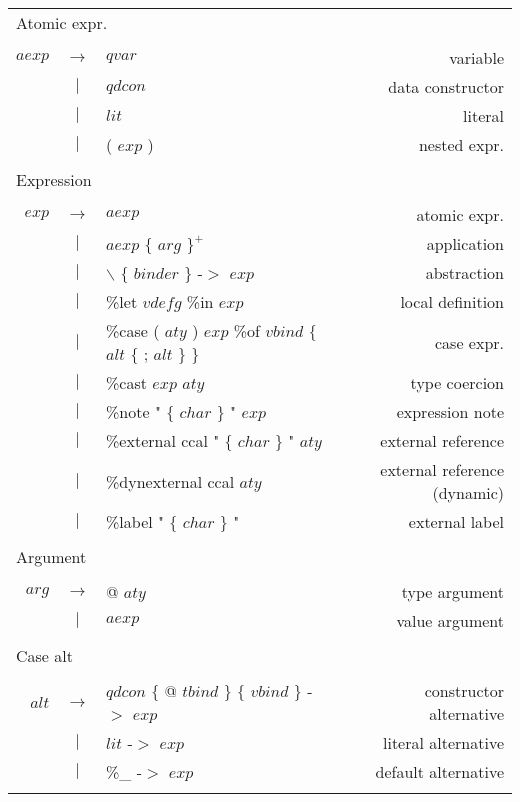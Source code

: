 \begin{scriptsize}
\begin{longtable}{ r c l r }
\multicolumn{4}{l}{Atomic expr.}			 \\
\\[0.01in]
$aexp$		& $ \rightarrow $	& $qvar$										& variable		\\
		& $ | $			& $qdcon$										& data constructor	\\
		& $ | $			& $lit$											& literal		\\
		& $ | $			& ( $exp$ ) 										& nested expr.		\\
\\[0.01in]

\multicolumn{4}{l}{Expression}			 \\
\\[0.01in]
$exp$		& $ \rightarrow $	& $aexp$										& atomic expr.		\\
		& $ | $			& $aexp$ $\{$ $arg$ $\}^{+}$ 								& application		\\
		& $ | $			& $\backslash$ $\{$ $binder$ $\}$ -$>$ $exp$						& abstraction		\\
		& $ | $			& \%let	$vdefg$ \%in $exp$								& local definition	\\
		& $ | $			& \%case ( $aty$ ) $exp$ \%of $vbind$ $\{$ $alt$ $\{$ ; $alt$ $\}$ $\}$			& case expr.		\\
		& $ | $			& \%cast $exp$ $aty$									& type coercion		\\
		& $ | $			& \%note "  $\{$ $char$ $\}$ " $exp$							& expression note	\\
		& $ | $			& \%external ccal " $\{$ $char$ $\}$ " $aty$						& external reference	\\
		& $ | $			& \%dynexternal ccal $aty$								& external reference (dynamic)	\\
		& $ | $			& \%label " $\{$ $char$ $\}$ "								& external label	\\
\\[0.01in]

\multicolumn{4}{l}{Argument}			 \\
\\[0.01in]
$arg$		& $ \rightarrow $	& @ $aty$										& type argument		\\
		& $ | $			& $aexp$										& value argument	\\
\\[0.01in]

\multicolumn{4}{l}{Case alt}			 \\
\\[0.01in]
$alt$		& $ \rightarrow $	& $qdcon$ $\{$ @ $tbind$ $\}$ $\{$ $vbind$ $\}$ -$>$ $exp$				& constructor alternative \\
		& $ | $			& $lit$ -$>$ $exp$									& literal alternative 	\\
		& $ | $			& \%\_ -$>$ $exp$									& default alternative	\\
\\[0.01in]


\end{longtable}
\end{scriptsize}
